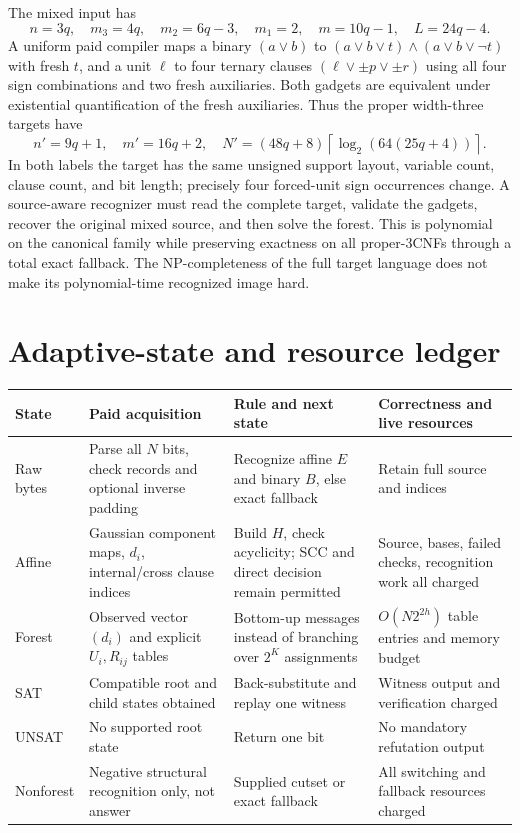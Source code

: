 \documentclass[11pt]{article}
\begin{document}
The mixed input has
\[
n=3q,\quad m_3=4q,\quad m_2=6q-3,\quad m_1=2,
\quad m=10q-1,\quad L=24q-4.
\tag{5}
\]
A uniform paid compiler maps a binary $(a\vee b)$
to $(a\vee b\vee t)\wedge(a\vee b\vee\neg t)$
with fresh $t$, and a unit $\ell$ to four
ternary clauses $(\ell\vee \pm p\vee\pm r)$
using all four sign combinations and two fresh
auxiliaries. Both gadgets are equivalent under
existential quantification of the fresh auxiliaries.
Thus the proper width-three targets have
\[
n'=9q+1,\quad m'=16q+2,\quad
N'=(48q+8)\left\lceil\log_2(64(25q+4))\right\rceil.
\tag{6}
\]
In both labels the target has the same unsigned
support layout, variable count, clause count, and
bit length; precisely four forced-unit sign
occurrences change. A source-aware recognizer
must read the complete target, validate the
gadgets, recover the original mixed source, and
then solve the forest. This is polynomial on the
canonical family while preserving exactness
on all proper-3CNFs through a total exact fallback.
The NP-completeness of the full target language
does not make its polynomial-time recognized image
hard.

\section{Adaptive-state and resource ledger}
\small
\begin{center}
\begin{tabular}{p{.17\linewidth}p{.23\linewidth}p{.25\linewidth}p{.26\linewidth}}
\toprule
State & Paid acquisition & Rule and next state & Correctness and live resources\\
\midrule
Raw bytes & Parse all $N$ bits, check records and optional inverse padding & Recognize affine $E$ and binary $B$, else exact fallback & Retain full source and indices\\
Affine & Gaussian component maps, $d_i$, internal/cross clause indices & Build $H$, check acyclicity; SCC and direct decision remain permitted & Source, bases, failed checks, recognition work all charged\\
Forest & Observed vector $(d_i)$ and explicit $U_i,R_{ij}$ tables & Bottom-up messages instead of branching over $2^K$ assignments & $O(N2^{2h})$ table entries and memory budget\\
SAT & Compatible root and child states obtained & Back-substitute and replay one witness & Witness output and verification charged\\
UNSAT & No supported root state & Return one bit & No mandatory refutation output\\
Nonforest & Negative structural recognition only, not answer & Supplied cutset or exact fallback & All switching and fallback resources charged\\
\bottomrule
\end{tabular}
\end{center}\normalsize
\end{document}
